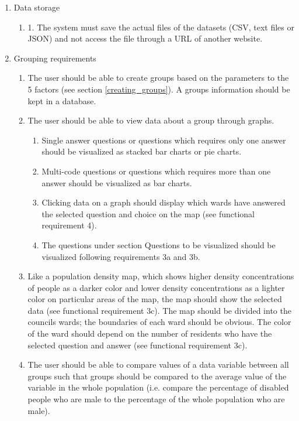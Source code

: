 \begin{enumerate}
  \item Data storage
    \begin{enumerate}
      \item 1.	The system must save the actual files of the datasets (CSV, text files or JSON) and not access the file through a URL of another website.
    \end{enumerate}
  \item Grouping requirements
    \begin{enumerate}
		\item The user should be able to create groups based on the parameters to the 5 factors (see section \ref{creating_groups}). A group\textquotesingle s information should be kept in a database.
		\item The user should be able to view data about a group through graphs.
			\begin{enumerate}
				\item Single answer questions or questions which requires only one answer should be visualized as stacked bar charts or pie charts.
				\item Multi-code questions or questions which requires more than one answer should be visualized as bar charts.
				\item Clicking data on a graph should display which wards have answered the selected question and choice on the map (see functional requirement 4).
				\item The questions under section Questions to be visualized should be visualized following requirements 3a and 3b.
			\end{enumerate}
		\item Like a population density map, which shows higher density concentrations of people as a darker color and lower density concentrations as a lighter color on particular areas of the map, the map should show the selected data (see functional requirement 3c). The map should be divided into the council\textquotesingle s wards; the boundaries of each ward should be obvious. The color of the ward should depend on the number of residents who have the selected question and answer (see functional requirement 3c).
		\item The user should be able to compare values of a data variable between all groups such that groups should be compared to the average value of the variable in the whole population (i.e. compare the percentage of disabled people who are male to the percentage of the whole population who are male).

\end{enumerate}
\end{enumerate}
